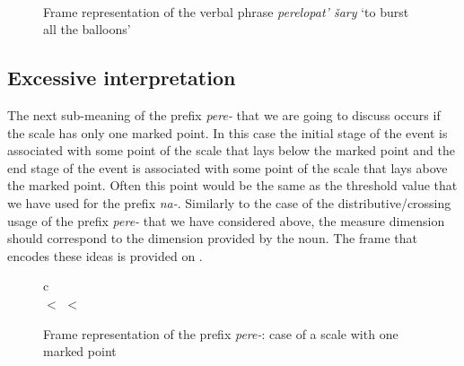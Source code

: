 \begin{figure}
\centering
{}\\
\hfill
\caption{Frame representation of the verbal phrase \textit{perelopat' \v{s}ary} `to burst all the balloons' \label{frame:pereburst:balloon}}
\end{figure}

\subsection{Excessive interpretation}
The next sub-meaning of the prefix \textit{pere-} that we are going to discuss occurs if the scale has only one marked point. In this case the initial stage of the event is associated with some point of the scale that lays below the marked point and the end stage of the event is associated with some point of the scale that lays above the marked point. Often this point would be the same as the threshold value that we have used for the prefix \textit{na-}. Similarly to the case of the distributive/crossing usage of the prefix \textit{pere-} that we have considered above, the measure dimension should correspond to the dimension provided by the noun. The frame that encodes these ideas is provided on .
\begin{figure}
\begin{center}
\begin{tabular}{c}
\\
 $<$  $<$ 
\end{tabular}
\end{center}
\caption{Frame representation of the prefix \textit{pere-}: case of a scale with one marked point \label{frame:pere:over}}
\end{figure}

